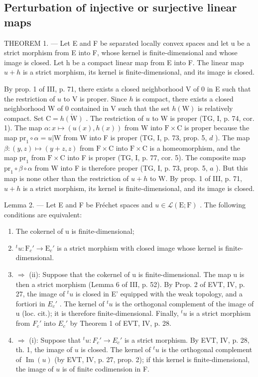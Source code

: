 \subsection{Perturbation of injective or surjective linear maps}

THEOREM 1. --- Let E and F be separated locally convex spaces and let u be a strict morphism from E into F, whose kernel is finite-dimensional and whose image is closed. Let h be a compact linear map from E into F. The linear map \(u + h\) is a strict morphism, its kernel is finite-dimensional, and its image is closed.

By prop. 1 of III, p. 71, there exists a closed neighborhood V of 0 in E such that the restriction of \(u\) to V is proper. Since \(h\) is compact, there exists a closed neighborhood W of 0 contained in V such that the set \(h(\mathrm{W})\) is relatively compact. Set \(\mathrm{C} = \overline{h(\mathrm{W})}\) . The restriction of \(u\) to W is proper (TG, I, p. 74, cor. 1). The map \(\alpha: x \mapsto (u(x), h(x))\) from W into \(\mathrm{F} \times \mathrm{C}\) is proper because the map \(\mathrm{pr}_1 \circ \alpha = u|\mathrm{W}\) from W into F is proper (TG, I, p. 73, prop. 5, \(d\) ). The map \(\beta: (y, z) \mapsto (y + z, z)\) from \(\mathrm{F} \times \mathrm{C}\) into \(\mathrm{F} \times \mathrm{C}\) is a homeomorphism, and the map \(\mathrm{pr}_1\) from \(\mathrm{F} \times \mathrm{C}\) into F is proper (TG, I, p. 77, cor. 5). The composite map \(\mathrm{pr}_1 \circ \beta \circ \alpha\) from W into F is therefore proper (TG, I, p. 73, prop. 5, \(a\) ). But this map is none other than the restriction of \(u + h\) to W. By prop. 1 of III, p. 71, \(u + h\) is a strict morphism, its kernel is finite-dimensional, and its image is closed.

Lemma 2. --- Let E and F be Fréchet spaces and \(u \in \mathcal{L}(\mathrm{E};\mathrm{F})\) . The following conditions are equivalent:

\begin{enumerate}
\def\labelenumi{(\roman{enumi})}
\item
  The cokernel of u is finite-dimensional;
\item
  \(^{t}u \colon \mathrm{F}_c' \to \mathrm{E}_c'\) is a strict morphism with closed image whose kernel is finite-dimensional.
\item
  \(\Longrightarrow\) (ii): Suppose that the cokernel of u is finite-dimensional. The map u is then a strict morphism (Lemma 6 of III, p. 52). By Prop. 2 of EVT, IV, p. 27, the image of \(^{t}u\) is closed in E' equipped with the weak topology, and a fortiori in \(E_{c}'\) . The kernel of \(^{t}u\) is the orthogonal complement of the image of u (loc. cit.); it is therefore finite-dimensional. Finally, \(^{t}u\) is a strict morphism from \(F_{c}'\) into \(E_{c}'\) by Theorem 1 of EVT, IV, p. 28.
\item
  \(\Longrightarrow\) (i): Suppose that \(^t u\colon F_c' \to E_c'\) is a strict morphism. By EVT, IV, p. 28, th. 1, the image of \(u\) is closed. The kernel of \(^t u\) is the orthogonal complement of \(\operatorname{Im}(u)\) (by EVT, IV, p. 27, prop. 2); if this kernel is finite-dimensional, the image of \(u\) is of finite codimension in F.
\end{enumerate}

